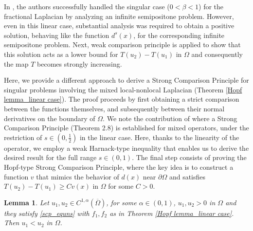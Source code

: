 \documentclass[reqno,oneside]{amsart}
\newtheorem{lemma}[theorem]{Lemma}
\theoremstyle{definition}
\theoremstyle{remark}
\numberwithin{equation}{section}
\newcommand{\Om} {\Omega}
\newcommand{\pa}{\partial}
\begin{document}
In \cite{giacomoni2019existence}, the authors successfully handled the singular case ($0<\beta<1$) for the fractional Laplacian by analyzing an infinite semipositone problem. However, even in this linear case, substantial analysis was required to obtain a positive solution, behaving like the function $d^s(x)$, for the corresponding infinite semipositone problem. Next, weak comparison principle is applied to show that this solution acts as a lower bound for $T(u_2) - T(u_1)$ in $\Omega$ and consequently the map $T$ becomes strongly increasing.

Here, we provide a different approach to derive a Strong Comparison Principle for singular problems involving the mixed local-nonlocal Laplacian (Theorem \ref{Hopf lemma_linear case}). The proof proceeds by first obtaining a strict comparison between the functions themselves, and subsequently between their normal derivatives on the boundary of $\Om$. We note the contribution of \cite{dhanya2024interiorboundaryregularitymixed} where a Strong Comparison Principle (Theorem 2.8) is established for mixed operators, under the restriction of $s\in \left(0, \frac{1}{2}\right)$ in the linear case. Here, thanks to the linearity of the operator, we employ a weak Harnack-type inequality that enables us to derive the desired result for the full range $s\in (0,1)$. The final step consists of proving the Hopf-type Strong Comparison Principle, where the key idea is to construct a function $v$ that mimics the behavior of $d(x)$ near $\pa\Om$ and satisfies $T(u_2) - T(u_1) \geq Cv(x)$ in $\Om$ for some $C>0$.

\begin{lemma}\label{strict comparison}
    Let $u_1, u_2 \in C^{1,\alpha}(\overline{\Om})$, for some $\alpha\in(0,1)$, $u_1, u_2 > 0$ in $\Om$ and they satisfy \eqref{scp_equns} with $f_1, f_2$ as in Theorem \ref{Hopf lemma_linear case}. Then $u_1<u_2$ in $\Om$.
\end{lemma}
\end{document}
